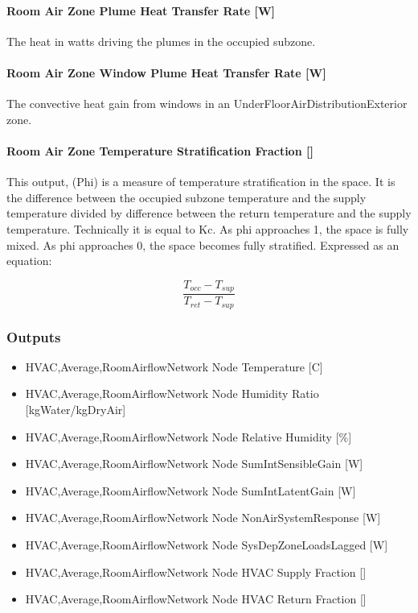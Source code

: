 \paragraph{Room Air Zone Plume Heat Transfer Rate {[}W{]}}\label{room-air-zone-plume-heat-transfer-rate-w}

The heat in watts driving the plumes in the occupied subzone.

\paragraph{Room Air Zone Window Plume Heat Transfer Rate {[}W{]}}\label{room-air-zone-window-plume-heat-transfer-rate-w}

The convective heat gain from windows in an UnderFloorAirDistributionExterior zone.

\paragraph{Room Air Zone Temperature Stratification Fraction {[]}}\label{room-air-zone-temperature-stratification-fraction}

This output, (Phi) is a measure of temperature stratification in the space. It is the difference between the occupied subzone temperature and the supply temperature divided by difference between the return temperature and the supply temperature. Technically it is equal to Kc. As phi approaches 1, the space is fully mixed. As phi approaches 0, the space becomes fully stratified. Expressed as an equation:

\begin{equation}
  \frac{T_{occ} - T_{sup}}{T_{ret} - T_{sup}}
\end{equation}

\subsubsection{Outputs}\label{outputs-7-009}

\begin{itemize}
\item
  HVAC,Average,RoomAirflowNetwork Node Temperature {[}C{]}
\item
  HVAC,Average,RoomAirflowNetwork Node Humidity Ratio {[}kgWater/kgDryAir{]}
\item
  HVAC,Average,RoomAirflowNetwork Node Relative Humidity {[}\%{]}
\item
  HVAC,Average,RoomAirflowNetwork Node SumIntSensibleGain {[}W{]}
\item
  HVAC,Average,RoomAirflowNetwork Node SumIntLatentGain {[}W{]}
\item
  HVAC,Average,RoomAirflowNetwork Node NonAirSystemResponse {[}W{]}
\item
  HVAC,Average,RoomAirflowNetwork Node SysDepZoneLoadsLagged {[}W{]}
\item
  HVAC,Average,RoomAirflowNetwork Node HVAC Supply Fraction {[]}
\item
  HVAC,Average,RoomAirflowNetwork Node HVAC Return Fraction {[]}
\end{itemize}

